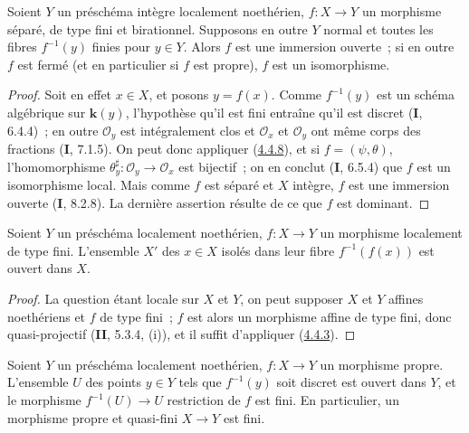 \begin{corollary}[4.4.9]
\label{III.4.4.9-fr}
Soient $Y$ un préschéma intègre localement noethérien, $f:X\to Y$ un
morphisme séparé, de type fini et birationnel. Supposons en outre $Y$ normal
et toutes les fibres $f^{-1}(y)$ finies pour $y\in Y$. Alors $f$ est une
immersion ouverte~; si en outre $f$ est fermé (et en particulier si $f$ est
propre), $f$ est un isomorphisme.
\end{corollary}

\begin{proof}
Soit en effet $x\in X$, et posons $y=f(x)$. Comme $f^{-1}(y)$ est un schéma
algébrique sur $\boldsymbol{k}(y)$, l'hypothèse qu'il est fini entraîne qu'il est discret
(\textbf{I}, 6.4.4)~; en outre $\mathcal O_y$ est intégralement clos et
$\mathcal O_x$ et $\mathcal O_y$ ont même corps des fractions (\textbf{I}, 7.1.5).
On peut donc appliquer (\hyperref[III.4.4.8-fr]{4.4.8}), et si
$f=(\psi,\theta)$, l'homomorphisme
$\theta_y^\sharp:\mathcal O_y\to\mathcal O_x$ est bijectif~; on en conclut
(\textbf{I}, 6.5.4) que $f$ est un isomorphisme local. Mais comme $f$ est séparé et
$X$ intègre, $f$ est une immersion ouverte (\textbf{I}, 8.2.8). La dernière assertion
résulte de ce que $f$ est dominant.
\end{proof}

\begin{proposition}[4.4.10]
\label{III.4.4.10-fr}
Soient $Y$ un préschéma localement noethérien, $f:X\to Y$ un morphisme
localement de type fini. L'ensemble $X'$ des $x\in X$ isolés dans leur fibre
$f^{-1}(f(x))$ est ouvert dans $X$.
\end{proposition}

\begin{proof}
La question étant locale sur $X$ et $Y$, on peut supposer $X$ et $Y$ affines
noethériens et $f$ de type fini~; $f$ est alors un morphisme affine de type
fini, donc quasi-projectif (\textbf{II}, 5.3.4, (i)), et il suffit d'appliquer
(\hyperref[III.4.4.3-fr]{4.4.3}).
\end{proof}


\begin{corollary}[4.4.11]
\label{III.4.4.11-fr}
Soient $Y$ un préschéma localement noethérien, $f:X\to Y$ un morphisme
propre. L'ensemble $U$ des points $y\in Y$ tels que $f^{-1}(y)$ soit discret
est ouvert dans $Y$, et le morphisme $f^{-1}(U)\to U$ restriction de $f$ est
fini. En particulier, un morphisme propre et quasi-fini $X\to Y$ est fini.
\end{corollary}

